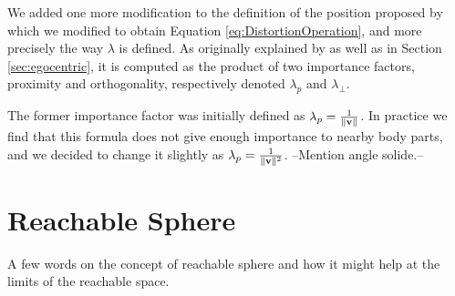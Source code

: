 We added one more modification to the definition of the position proposed by \cite{molla2017egocentric} which we modified to obtain Equation \ref{eq:DistortionOperation}, and more precisely the way $\lambda $ is defined. As originally explained by \cite{molla2016precise} as well as in Section \ref{sec:egocentric}, it is computed as the product of two importance factors, proximity and orthogonality, respectively denoted $\lambda_p$ and $\lambda_\perp $.

The former importance factor was initially defined as $\lambda_p = \frac{1}{\lVert\mathbf{v}\rVert}$. In practice we find that this formula does not give enough importance to nearby body parts, and we decided to change it slightly as $\lambda_p = \frac{1}{\lVert\mathbf{v}\rVert^2}$. --Mention angle solide.-- %

\section{Reachable Sphere}

A few words on the concept of reachable sphere and how it might help at the limits of the reachable space.
